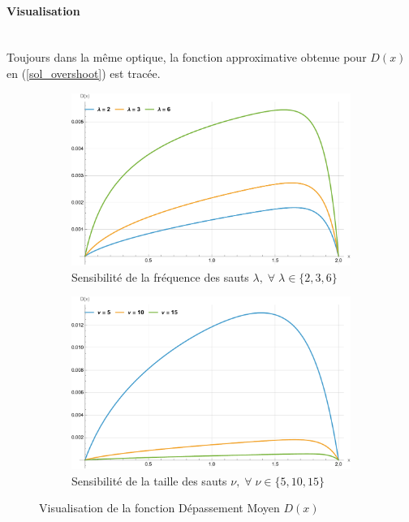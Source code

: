 \paragraph{Visualisation}\phantom{}\\
Toujours dans la même optique, la fonction approximative obtenue pour $D(x)$ en (\ref{sol_overshoot}) est tracée.
\begin{figure}[htb]
    \centering
    \begin{subfigure}{0.49\linewidth}
        \includegraphics[width=\linewidth]{img/validation/Ovs/overshoot_lambda.pdf}
        \caption{Sensibilité de la fréquence des sauts $\lambda,\;\forall\;\lambda\in\{2,3,6\}$}\label{fig:Overshoot_lambda_visualisation}
    \end{subfigure}
    \hfill
    \begin{subfigure}{0.49\linewidth}
        \includegraphics[width=\linewidth]{img/validation/Ovs/overshoot_nu.pdf}
        \caption{Sensibilité de la taille des sauts $\nu,\;\forall\;\nu\in\{5,10,15\}$}\label{fig:Overshoot_nu_visualisation}
    \end{subfigure}
    \hfill
    \caption{Visualisation de la fonction Dépassement Moyen $D(x)$}\label{fig:AreaVisualisation}
\end{figure}
